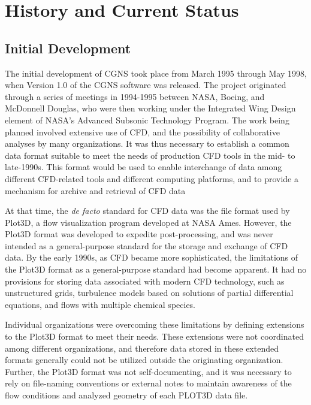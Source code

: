 \section{History and Current Status}
\label{s:history}
\thispagestyle{plain}

\subsection{Initial Development}

\enlargethispage{\baselineskip}
The initial development of CGNS took place from March 1995 through
May 1998, when Version 1.0 of the CGNS software was released.
The project originated through a series of meetings in 1994-1995 between
NASA, Boeing, and McDonnell Douglas, who were then working under the
Integrated Wing Design element of NASA's Advanced Subsonic Technology
Program.
The work being planned involved extensive use of CFD, and the
possibility of collaborative analyses by many organizations.
It was thus necessary to establish a common data format suitable to meet
the needs of production CFD tools in the mid- to late-1990s.
This format would be used to enable interchange of data among different
CFD-related tools and different computing platforms, and to provide a
mechanism for archive and retrieval of CFD data

At that time, the \textit{de facto} standard for CFD data was the file
format used by Plot3D, a flow visualization program developed at NASA
Ames.
However, the Plot3D format was developed to expedite post-processing,
and was never intended as a general-purpose standard for the storage
and exchange of CFD data.
By the early 1990s, as CFD became more sophisticated, the limitations of
the Plot3D format as a general-purpose standard had become apparent.
It had no provisions for storing data associated with modern CFD
technology, such as unstructured grids, turbulence models based on
solutions of partial differential equations, and flows with multiple
chemical species.

Individual organizations were overcoming these limitations by defining
extensions to the Plot3D format to meet their needs.
These extensions were not coordinated among different organizations, and
therefore data stored in these extended formats generally could not be
utilized outside the originating organization.
Further, the Plot3D format was not self-documenting, and it was
necessary to rely on file-naming conventions or external notes to
maintain awareness of the flow conditions and analyzed geometry of each
PLOT3D data file.

